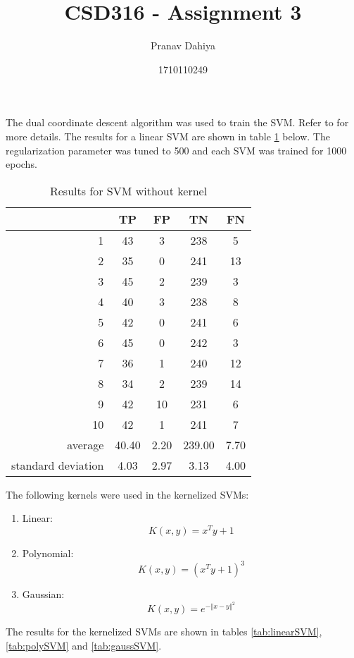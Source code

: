 \documentclass[12pt]{article}
\title{CSD316 - Assignment 3}
\author{Pranav Dahiya}
\date{1710110249}
\begin{document}
  \maketitle
  The dual coordinate descent algorithm was used to train the SVM. Refer to \cite{dual} for more details. The results for a linear SVM are shown in table \ref{tab:SVM} below. The regularization parameter was tuned to 500 and each SVM was trained for 1000 epochs.

  \begin{table}[H]
    \centering
    \caption{Results for SVM without kernel}
    \vspace{0.25cm}
    \label{tab:SVM}
    \begin{tabular}{r|c|c|c|c}
      &TP&FP&TN&FN\\
      \hline
      1&43&3&238&5\\
      2&35&0&241&13\\
      3&45&2&239&3\\
      4&40&3&238&8\\
      5&42&0&241&6\\
      6&45&0&242&3\\
      7&36&1&240&12\\
      8&34&2&239&14\\
      9&42&10&231&6\\
      10&42&1&241&7\\
      \hline
      average&40.40&2.20&239.00&7.70\\
      standard deviation&4.03&2.97&3.13&4.00\\
    \end{tabular}
  \end{table}

  The following kernels were used in the kernelized SVMs:
  \begin{enumerate}
    \item Linear:
    $$K(x,y) = x^Ty+1$$
    \item Polynomial:
    $$K(x,y) = (x^Ty+1)^3$$
    \item Gaussian:
    $$K(x,y) = e^{- \left\Vert x-y \right\Vert^2}$$
  \end{enumerate}

  The results for the kernelized SVMs are shown in tables \ref{tab:linearSVM}, \ref{tab:polySVM} and \ref{tab:gaussSVM}.
\end{document}

